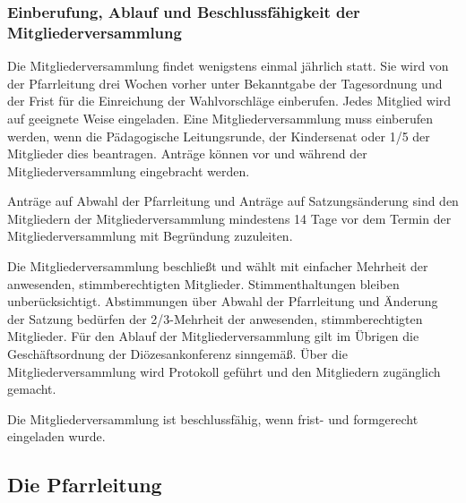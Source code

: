 \documentclass[12pt]{report}
\begin{document}
\begin{flushleft}
\begin{itemize}
\subsubsection{Einberufung, Ablauf und Beschlussfähigkeit der Mitgliederversammlung}
Die Mitgliederversammlung findet wenigstens einmal jährlich statt. Sie wird von der Pfarrleitung
drei Wochen vorher unter Bekanntgabe der Tagesordnung und der Frist für die Einreichung
der Wahlvorschläge einberufen. Jedes Mitglied wird auf geeignete Weise eingeladen.
Eine Mitgliederversammlung muss einberufen werden, wenn die Pädagogische Leitungsrunde,
der Kindersenat oder 1/5 der Mitglieder dies beantragen. Anträge können vor und während der 
Mitgliederversammlung eingebracht werden.

Anträge auf Abwahl der Pfarrleitung und Anträge auf Satzungsänderung sind den Mitgliedern
der Mitgliederversammlung mindestens 14 Tage vor dem Termin der Mitgliederversammlung mit
Begründung zuzuleiten.

Die Mitgliederversammlung beschließt und wählt mit einfacher Mehrheit der anwesenden, stimmberechtigten Mitglieder.
Stimmenthaltungen bleiben unberücksichtigt. Abstimmungen über
Abwahl der Pfarrleitung und Änderung der Satzung bedürfen der 2/3-Mehrheit der anwesenden,
stimmberechtigten Mitglieder. Für den Ablauf der Mitgliederversammlung gilt im
Übrigen die Geschäftsordnung der Diözesankonferenz sinngemäß. Über die Mitgliederversammlung
wird Protokoll geführt und den Mitgliedern zugänglich gemacht.

Die Mitgliederversammlung ist beschlussfähig, wenn frist- und formgerecht eingeladen wurde.
\end{itemize}
\subsection{Die Pfarrleitung}

\end{flushleft}
\end{document}
